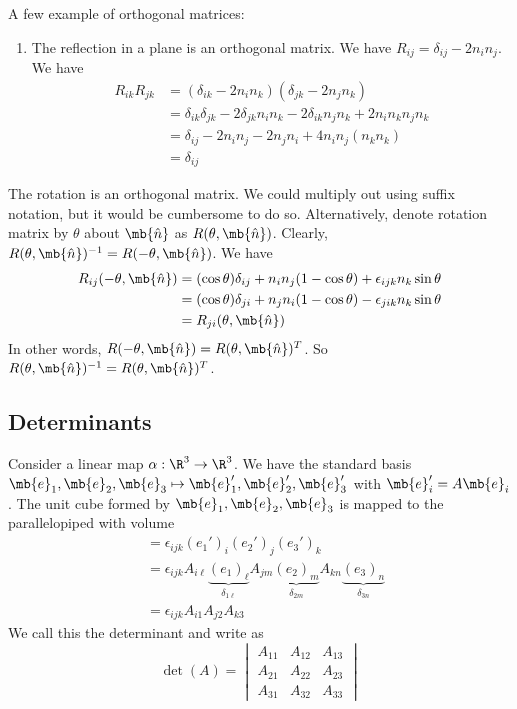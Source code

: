 \documentclass[a4paper]{article}
\begin{document}
\begin{eg}
  A few example of orthogonal matrices:
  \begin{enumerate}
  \item The reflection in a plane is an orthogonal matrix. We have $R_{ij} = \delta_{ij} - 2n_in_j$. We have
    \begin{align*}
      R_{ik}R_{jk} &= (\delta_{ik} - 2n_in_k)(\delta_{jk} - 2n_jn_k)\\
      &= \delta_{ik}\delta_{jk} - 2\delta_{jk}n_in_k - 2\delta_{ik}n_jn_k + 2n_in_kn_jn_k\\
      &= \delta_{ij} - 2n_in_j - 2n_jn_i + 4n_in_j(n_kn_k)\\
      &= \delta_{ij}
    \end{align*}
  \end{enumerate}
  \item The rotation is an orthogonal matrix. We could multiply out using suffix notation, but it would be cumbersome to do so. Alternatively, denote rotation matrix by $\theta$ about $\mb{\hat n}$ as $R(\theta, \mb{\hat n})$. Clearly, $R(\theta, \mb{\hat n})^{-1} = R(-\theta, \mb{\hat n})$. We have
    \begin{align*}
      R_{ij}(-\theta, \mb{\hat n}) &= (\cos\theta)\delta_{ij} + n_in_j(1 - \cos\theta) + \epsilon_{ijk}n_k\sin\theta\\
      &= (\cos\theta)\delta_{ji} + n_jn_i(1 - \cos\theta) - \epsilon_{jik}n_k\sin\theta\\
      &= R_{ji}(\theta, \mb{\hat n})
    \end{align*}
    In other words, $R(-\theta, \mb{\hat n}) = R(\theta, \mb{\hat n})^T$. So $R(\theta, \mb{\hat n})^{-1} = R(\theta, \mb{\hat n})^T$.
\end{eg}

\subsection{Determinants}

Consider a linear map $\alpha: \R^3\to \R^3$. We have the standard basis $\mb{e}_1, \mb{e}_2, \mb{e}_3\mapsto \mb{e}_1', \mb{e}_2', \mb{e}_3'$ with $\mb{e}_i' = A\mb{e}_i$. The unit cube formed by $\mb{e}_1, \mb{e}_2, \mb{e}_3$ is mapped to the parallelopiped with volume
\begin{align*}
  [\mb{e}_1', \mb{e}_2', \mb{e}_3'] &= \epsilon_{ijk}(e_1')_i (e_2')_j (e_3')_k\\
  &= \epsilon_{ijk} A_{i\ell} \underbrace{(e_1)_\ell}_{\delta_{1\ell}} A_{jm}\underbrace{(e_2)_m}_{\delta_{2m}} A_{kn}\underbrace{(e_3)_n}_{\delta_{3n}}\\
  &= \epsilon_{ijk} A_{i1}A_{j2}A_{k3}
\end{align*}
We call this the determinant and write as
\[
\det(A) = \begin{vmatrix} A_{11} & A_{12} & A_{13}\\A_{21} & A_{22} & A_{23} \\ A_{31} & A_{32} & A_{33}\end{vmatrix}
\]
\end{document}
